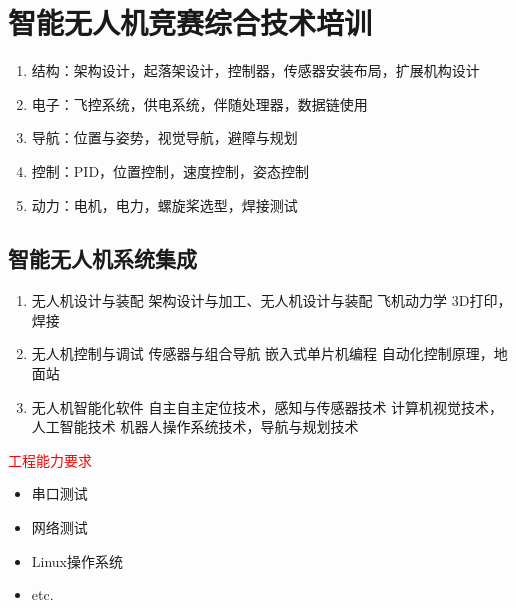 \section{智能无人机竞赛综合技术培训}

\begin{enumerate}
    \item 结构：架构设计，起落架设计，控制器，传感器安装布局，扩展机构设计
    \item 电子：飞控系统，供电系统，伴随处理器，数据链使用
    \item 导航：位置与姿势，视觉导航，避障与规划
    \item 控制：PID，位置控制，速度控制，姿态控制
    \item 动力：电机，电力，螺旋桨选型，焊接测试
\end{enumerate}

\subsection{智能无人机系统集成}

\begin{enumerate}
    \item 无人机设计与装配
        \subitem  架构设计与加工、无人机设计与装配
        \subitem 飞机动力学
        \subitem 3D打印，焊接
    \item 无人机控制与调试
        \subitem  传感器与组合导航
        \subitem 嵌入式单片机编程
        \subitem 自动化控制原理，地面站
    \item 无人机智能化软件
        \subitem  自主自主定位技术，感知与传感器技术
        \subitem 计算机视觉技术，人工智能技术
        \subitem 机器人操作系统技术，导航与规划技术 
\end{enumerate}

\textcolor{red}{工程能力要求}
\begin{itemize}
    \item 串口测试
    \item 网络测试
    \item Linux操作系统
    \item etc.
\end{itemize}
